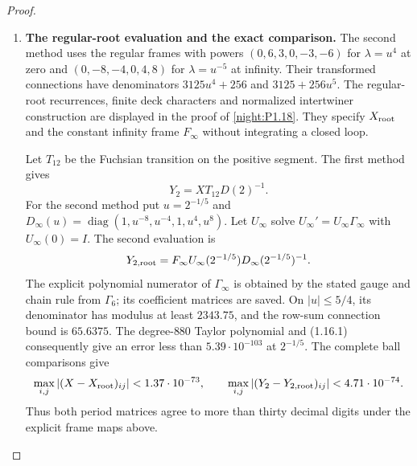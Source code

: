 \begin{proof}
\begin{enumerate}[label={$\langle1\rangle$\arabic*.}]
Likewise, the real intersection in (1.15.3) is computed from an
invertible four-equation subsystem in
$(\operatorname{Re}v_2,\operatorname{Im}v_2,
  \operatorname{Re}v_1,\operatorname{Im}v_1)$.
 proves the existence and uniqueness of the full intersection;
the unused equation is checked with its interval radius retained.
At $\lambda=1$ the resulting height ball has radius less than
$4\cdot10^{-91}$.  It is contained in the following wider displayed
interval:
\[
\begin{aligned}
 h_b(1)\in\bigl[&
 -1.03427662241632179949424884537834605259496477790218821132\\
 &\qquad\mathbin{\pm}8.11\cdot10^{-57}\bigr].
\end{aligned}
\]
It lies strictly between the two decimal endpoints in the statement.
Since $5/(3\pi)<1$, we have $h_b(1)+5/(3\pi)<0$.
The cusp asymptotic in \cref{night:P1.8} gives $h_b+c\to+\infty$ along a path
to the cusp.  Continuity on a path from $1$ to that region therefore
supplies a zero for $c=5/(3\pi)$, proving its inadmissibility.

\item \textbf{The regular-root evaluation and the exact comparison.}
The second method uses the regular frames with powers
$(0,6,3,0,-3,-6)$ for $\lambda=u^4$ at zero and
$(0,-8,-4,0,4,8)$ for $\lambda=u^{-5}$ at infinity.
Their transformed connections have denominators
$3125u^4+256$ and $3125+256u^5$.  The regular-root recurrences,
finite deck characters and normalized intertwiner construction
are displayed in the proof of \cref{night:P1.18}.  They specify $X_{\rm root}$
and the constant infinity frame $F_\infty$ without integrating a
closed loop.

Let $T_{12}$ be the Fuchsian transition on the positive segment.
The first method gives
\[
 Y_2=XT_{12}D(2)^{-1}.
\]
For the second method put $u=2^{-1/5}$ and
$D_\infty(u)=\operatorname{diag}(1,u^{-8},u^{-4},1,u^4,u^8)$.
Let $U_\infty$ solve $U_\infty'=U_\infty\Gamma_\infty$ with $U_\infty(0)=I$.  The second evaluation is
\[
 Y_{2,\rm root}=F_\infty U_\infty(2^{-1/5})
                         D_\infty(2^{-1/5})^{-1}.
\]
The explicit polynomial numerator of $\Gamma_\infty$ is obtained
by the stated gauge and chain rule from $\Gamma_6$; its coefficient
matrices are saved.  On $|u|\le5/4$, its denominator has modulus
at least $2343.75$, and the row-sum connection bound is $65.6375$.
The degree-$880$ Taylor polynomial and (1.16.1) consequently give
an error less than $5.39\cdot10^{-103}$ at $2^{-1/5}$.
The complete ball comparisons give
\[
 \max_{i,j}|(X-X_{\rm root})_{ij}|<1.37\cdot10^{-73},\qquad
 \max_{i,j}|(Y_2-Y_{2,\rm root})_{ij}|<4.71\cdot10^{-74}.
\]
Thus both period matrices agree to more than thirty decimal digits
under the explicit frame maps above.


\end{enumerate}
\end{proof}
